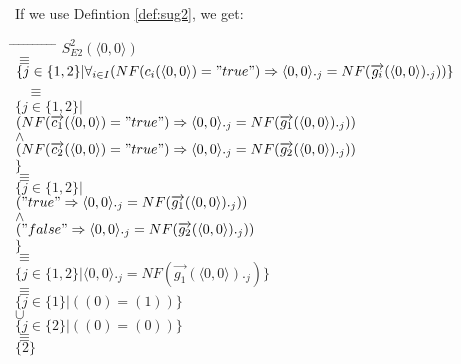 \index{}\documentclass[a4paper,10pt]{article}
\theoremstyle{plain}
\theoremstyle{definition}
\newcommand{\ovr}{\overrightarrow}
\begin{document}
\begin{defn}
\begin{example} [Let $E2$ be]
\begin{verbatim}
\end{verbatim}
\end{example}
If we use Defintion \ref{def:sug2}, we get:
\begin{tabbing}
\hspace*{5.mm} \= \hspace*{5.mm} \= \hspace*{5.mm} \= \hspace*{5.mm} \= \hspace*{5.mm} \= \hspace*{5.mm}  \= \hspace*{5.mm}  \= \hspace*{5.mm}  \= \hspace*{5.mm} \= \hspace*{5.mm} \= \hspace*{5.mm}\kill
\> \> $S_{E2}^2(\langle 0, 0 \rangle)$\\
\> $\equiv$\\
\> \> $\lbrace j \in \lbrace 1, 2 \rbrace \vert \forall_{i\in I} (NF(c_i( \langle  0,  0\rangle ) = "true") \Rightarrow  \langle  0,  0\rangle._j = NF(\ovr{g_i}( \langle  0,  0\rangle)._j))\rbrace $\\\
\> $\equiv$ \\
\> \>$\lbrace j \in \lbrace 1, 2 \rbrace \vert $ \\
\> \> \> $(NF(\ovr{c_1}( \langle  0,  0\rangle ) = "true") \Rightarrow  \langle  0,  0\rangle._j = NF(\ovr{g_{1}}( \langle  0,  0\rangle)._j)) $\\
\> \> \> $\wedge$ \\
\> \> \> $ (NF(\ovr{c_2}( \langle  0,  0\rangle ) = "true") \Rightarrow  \langle  0,  0\rangle._j = NF(\ovr{g_{2}}( \langle  0,  0\rangle)._j)) $ \\
\> \>$
\rbrace $\\
\> $\equiv$ \\
\> \> $\lbrace j \in \lbrace 1, 2 \rbrace \vert $\\
\> \> \> $("true" \Rightarrow  \langle  0,  0\rangle._j = NF(\ovr{g_{1}}( \langle  0,  0\rangle)._j))$ \\
\> \> \> $\wedge$ \\
\> \> \> $("false" \Rightarrow  \langle  0,  0\rangle._j = NF(\ovr{g_{2}}( \langle  0,  0\rangle)._j))$ \\
\> \> $\rbrace $\\
\> $\equiv$ \\
\> \> $\lbrace j \in \lbrace 1, 2 \rbrace \vert 
\langle  0,  0\rangle._j = NF(\ovr{g_1}( \langle  0,  0\rangle)._j)
\rbrace $\\
\> $\equiv$\\
\> \> $\lbrace j \in \lbrace 1 \rbrace \vert (( 0)  = ( 1)) \rbrace $\\
\> \> $\cup$ \\
\> \> $\lbrace j \in \lbrace 2 \rbrace \vert (( 0)  = ( 0)) \rbrace $\\
\> $\equiv $ \\
\> \> $\lbrace 2 \rbrace$ \\
\end{tabbing}


\end{defn}
\end{document}
